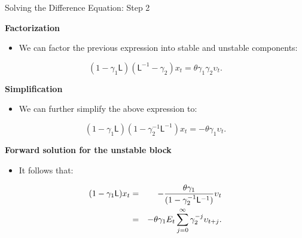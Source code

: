 \documentclass[11pt,aspectratio=169]{beamer}
\begin{document}
\begin{frame}{Solving the Difference Equation: Step 2}
\small

\textbf{Factorization}
\begin{itemize}
    \item We can factor the previous expression into stable and unstable components:
\end{itemize}
\begin{equation*}
(1-\gamma _{1}\mathsf{L})(\mathsf{L}^{-1}-\gamma _{2})x_{t}=\theta \gamma
_{1}\gamma _{2}\upsilon _{t}.
\end{equation*}

\textbf{Simplification}
\begin{itemize}
    \item We can further simplify the above expression to:
\end{itemize}
\begin{equation*}
(1-\gamma _{1}\mathsf{L})(1-\gamma _{2}^{-1}\mathsf{L}^{-1})x_{t}=-\theta
\gamma _{1}\upsilon _{t}.
\end{equation*}

\textbf{Forward solution for the unstable block}
\begin{itemize}
    \item It follows that:
\end{itemize}
\begin{eqnarray}
(1-\gamma _{1}\mathsf{L})x_{t} &=&-\frac{\theta \gamma _{1}}{(1-\gamma
_{2}^{-1}\mathsf{L}^{-1})}\upsilon _{t} \notag \\
&=&-\theta \gamma _{1}E_{t}\sum_{j=0}^{\infty }\gamma _{2}^{-j}\upsilon
_{t+j}. \label{Sol33}
\end{eqnarray}

\end{frame}
\end{document}

